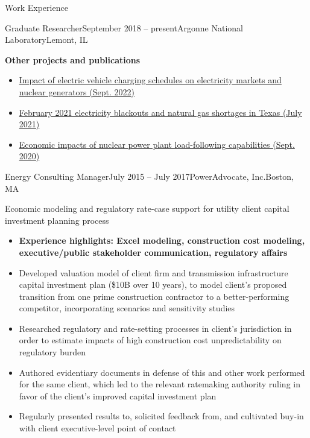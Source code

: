 \documentclass{resume} %
\begin{document}
\begin{rSection}{Work Experience}
\begin{rSubsection}{Graduate Researcher}{September 2018 -- present}{Argonne National Laboratory}{Lemont, IL}
  \item \textbf{Other projects and publications}
  \begin{itemize}
    \item \href{https://www.osti.gov/biblio/1891624}{Impact of electric vehicle charging schedules on electricity markets and nuclear generators (Sept. 2022)}
    \item \href{https://www.osti.gov/biblio/1822217}{February 2021 electricity blackouts and natural gas shortages in Texas (July 2021)}
    \item \href{https://www.osti.gov/biblio/1701718}{Economic impacts of nuclear power plant load-following capabilities (Sept. 2020)}
  \end{itemize}

\end{rSubsection}


\begin{rSubsection}{Energy Consulting Manager}{July 2015 -- July 2017}{PowerAdvocate, Inc.}{Boston, MA}
  \setlength{\itemsep}{-3pt}
  \item Economic modeling and regulatory rate-case support for utility client capital investment planning process
  \begin{itemize}
    \item \textbf{Experience highlights: Excel modeling, construction cost modeling, executive/public stakeholder communication, regulatory affairs}
    \item Developed valuation model of client firm and transmission infrastructure capital investment plan (\$10B over 10 years), to model client's proposed transition from one prime construction contractor to a better-performing competitor, incorporating scenarios and sensitivity studies
    \item Researched regulatory and rate-setting processes in client's jurisdiction in order to estimate impacts of high construction cost unpredictability on regulatory burden
    \item Authored evidentiary documents in defense of this and other work performed for the same client, which led to the relevant ratemaking authority ruling in favor of the client's improved capital investment plan
    \item Regularly presented results to, solicited feedback from, and cultivated buy-in with client executive-level point of contact
  \end{itemize}
\end{rSubsection}


\end{rSection}
\end{document}
